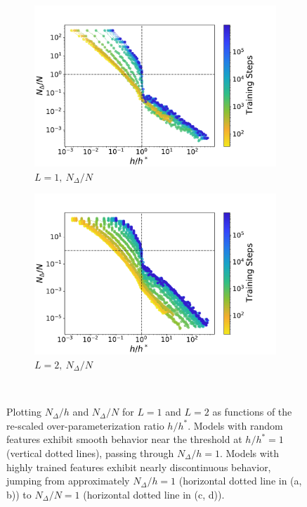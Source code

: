 \documentclass[11pt]{article}
\begin{document}
\begin{figure}[!h]
{\begin{subfigure}{.7\linewidth}
      \includegraphics[width=\linewidth]{docs/assets/h_h_star_vs_N_del_N_L=1.pdf}
      \caption{$L=1, \ N_\Delta/N$}
    \end{subfigure}%
    \begin{subfigure}{.7\linewidth}
      \centering
      \includegraphics[width=\linewidth]{docs/assets/h_h_star_vs_N_del_N_L=2.pdf}
      \caption{$L=2, \ N_\Delta/N$}
    \end{subfigure}
}\\
\caption{Plotting $N_\Delta/h$ and $N_\Delta/N$ for $L=1$ and $L=2$ as functions of the re-scaled over-parameterization ratio $h/h^*$. Models with random features exhibit smooth behavior near the threshold at $h/h^*=1$ (vertical dotted lines), passing through $N_\Delta/h=1$. Models with highly trained features exhibit nearly discontinuous behavior, jumping from approximately $N_\Delta/h=1$ (horizontal dotted line in (a, b)) to $N_\Delta/N=1$ (horizontal dotted line in (c, d)).}
\label{N_del_discontinuity}
\end{figure}
\end{document}
